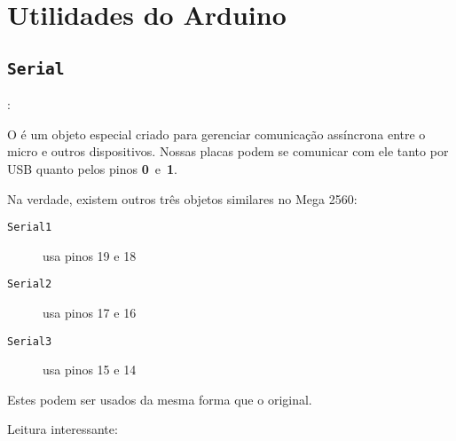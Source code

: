
\section{Utilidades do Arduino}


\subsection{\texttt{Serial}}


\begin{frame}[b]{\insertsection: \insertsubsection}

	O  é um objeto especial criado para gerenciar comunicação assíncrona entre o micro e outros dispositivos. Nossas placas podem se comunicar com ele tanto por USB quanto pelos pinos \textbf{0}~e~\textbf{1}.

	\medskip
	Na verdade, existem outros três objetos similares no Mega 2560:
	\begin{description}
		\item[\texttt{Serial1}] usa pinos 19 e 18
		\item[\texttt{Serial2}] usa pinos 17 e 16
		\item[\texttt{Serial3}] usa pinos 15 e 14
	\end{description}

Estes podem ser usados da mesma forma que o original.

	\vfill
	Leitura interessante: 

\end{frame}










